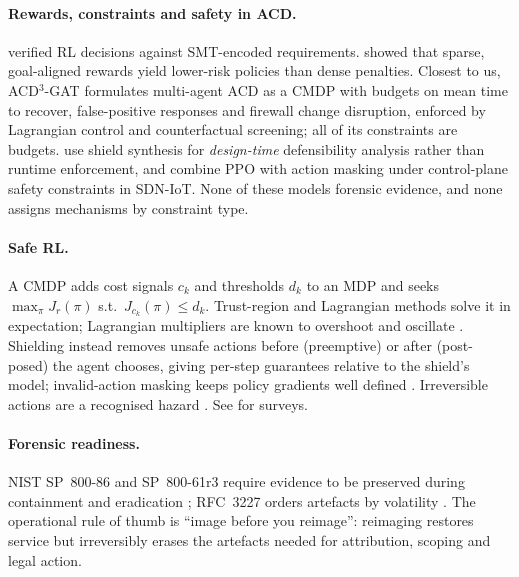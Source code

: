 \documentclass[10pt]{article}
\begin{document}
\paragraph{Rewards, constraints and safety in ACD.}
\citet{dutta2021smt} verified RL decisions against SMT-encoded requirements.
\citet{bates2025lessismore,bates2026beyond} showed that sparse, goal-aligned
rewards yield lower-risk policies than dense penalties. Closest to us,
ACD$^3$-GAT \citep{acd3gat2026} formulates multi-agent ACD as a CMDP with
budgets on mean time to recover, false-positive responses and firewall change
disruption, enforced by Lagrangian control and counterfactual screening; all
of its constraints are budgets. \citet{hsain2026shielded} use shield synthesis
for \emph{design-time} defensibility analysis rather than runtime enforcement,
and \citet{jamshidi2026sdn} combine PPO with action masking under
control-plane safety constraints in SDN-IoT. None of these models forensic
evidence, and none assigns mechanisms by constraint type.

\paragraph{Safe RL.}
A CMDP \citep{altman1999cmdp} adds cost signals $c_k$ and thresholds $d_k$ to
an MDP and seeks $\max_\pi J_r(\pi)$ s.t.\ $J_{c_k}(\pi)\le d_k$. Trust-region
\citep{achiam2017cpo} and Lagrangian \citep{tessler2019rcpo,ray2019safetygym}
methods solve it in expectation; Lagrangian multipliers are known to overshoot
and oscillate \citep{stooke2020pid}. Shielding \citep{alshiekh2018shielding}
instead removes unsafe actions before (preemptive) or after (post-posed) the
agent chooses, giving per-step guarantees relative to the shield's model;
invalid-action masking keeps policy gradients well defined
\citep{huang2022masking}. Irreversible actions are a recognised hazard
\citep{grinsztajn2021reversibility}. See \citep{garcia2015survey,gu2024review}
for surveys.

\paragraph{Forensic readiness.}
NIST SP~800-86 and SP~800-61r3 require evidence to be preserved during
containment and eradication \citep{nist80086,nist80061r3}; RFC~3227 orders
artefacts by volatility \citep{rfc3227}. The operational rule of thumb is
``image before you reimage'': reimaging restores service but irreversibly
erases the artefacts needed for attribution, scoping and legal action.
\end{document}
